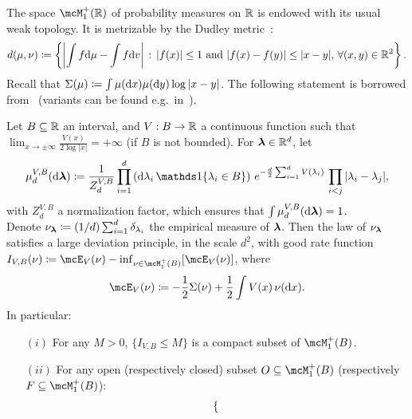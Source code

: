 \myskip
The space $\mcM_1^+(\bbR)$ of probability measures on $\mathbb{R}$ is endowed with its usual weak topology. 
It is metrizable by the Dudley metric~\citep{bogachev2007measure}:
\begin{equation}
    \label{eq:dudley}
    d(\mu, \nu) \coloneqq \left\{\left|\int f \mathrm{d} \mu - \int f \mathrm{d} v\right| \, : \, |f(x)| \leq 1 \textrm{ and } |f(x) - f(y)| \leq |x - y|, \, \forall (x, y) \in \mathbb{R}^2\right\}.
\end{equation}
Recall that $\Sigma(\mu) \coloneqq \int \mu(\mathrm{d} x) \mu(\mathrm{d} y) \log |x-y|$.
The following statement is borrowed from~\cite{fan2015convergence} (variants can be found e.g.\ in~\cite{arous1997large,anderson2010introduction}).
\begin{proposition}
    \label{prop:ldp_empirical_measure_conditioned}
    Let $B \subseteq \mathbb{R}$ an interval, and $V : B \to \mathbb{R}$ a continuous function such that $\lim_{x \to \pm \infty} \frac{V(x)}{2 \log |x|} = +\infty$ (if $B$ is not bounded).
    For ${\boldsymbol{\lambda}} \in \mathbb{R}^d$, let
    \begin{align}\label{eq:coulomb_gas_constraint}
        \mu_{d}^{V,B}(\rd \blambda) \coloneqq \frac{1}{Z_{d}^{V,B}} \prod_{i=1}^d \left(\rd \lambda_i \, \indi\{\lambda_i \in B\} \right) \, e^{-\frac{d}{2} \sum_{i=1}^d V(\lambda_i)} \, \prod_{i < j} |\lambda_i - \lambda_j|,
    \end{align}
    with $Z_d^{V,B}$ a normalization factor, which ensures that $\int \mu_d^{V, B}(\mathrm{d} {\boldsymbol{\lambda}}) = 1$.\\
    Denote $\nu_{\boldsymbol{\lambda}} \coloneqq (1/d) \sum_{i=1}^d \delta_{\lambda_i}$ the empirical measure of ${\boldsymbol{\lambda}}$.
    Then the law of $\nu_{\boldsymbol{\lambda}}$ satisfies a large deviation principle, in the scale $d^2$, with good rate function $I_{V,B}(\nu) \coloneqq \mcE_V(\nu) - \inf_{\nu \in \mcM_1^+(B)}[\mcE_V(\nu)]$, where 
    \begin{align}\label{eq:E_V}
        \mcE_V(\nu) \coloneqq - \frac{1}{2} \Sigma(\nu) + \frac{1}{2} \int V(x) \, \nu(\rd x).
    \end{align}
    In particular: 
    \begin{itemize}
        \item[$(i)$] For any $M > 0$, $\{I_{V, B} \leq M\}$ is a compact subset of $\mcM_1^+(B)$.
        \item[$(ii)$]  
        For any open (respectively closed) subset $O \subseteq \mcM_1^+(B)$ (respectively $F \subseteq \mcM_1^+(B)$): 
        \begin{equation*}
            \begin{dcases}

\end{dcases}
\end{equation*}
\end{itemize}
\end{proposition}
